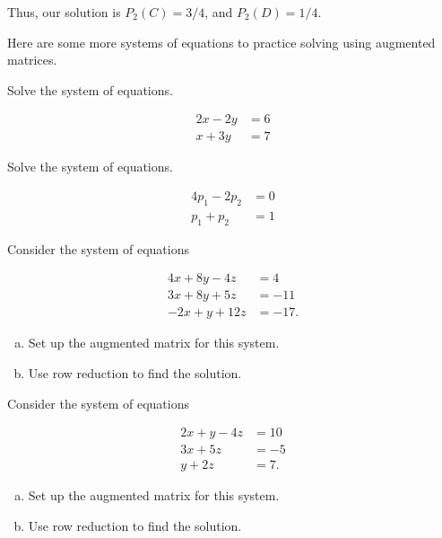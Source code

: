 Thus, our solution is $P_2(C)=3/4$, and $P_2(D)=1/4$.

Here are some more systems of equations to practice solving using augmented matrices.

\begin{xca}
Solve the system of equations.

\[\begin{matrix}
2x-2y&=6\\x+3y&=7
\end{matrix}\]

\end{xca}


\begin{xca}
Solve the system of equations.

\[\begin{matrix}
4p_1-2p_2&=0\\p_1+p_2&=1
\end{matrix}\]
\end{xca}

\begin{xca} 
Consider the system of equations 

\[\begin{matrix}
4x+8y-4z&=4\\3x+8y+5z&=-11\\-2x+y+12z&=-17.
\end{matrix}\]
\begin{enumerate}[(a)]
\item Set up the augmented matrix for this system.
\item Use row reduction to find the solution.

\end{enumerate}
\end{xca}

\begin{xca}
Consider the system of equations 

\[\begin{matrix}
2x+y-4z&=10\\3x+5z&=-5\\y+2z&=7.
\end{matrix}\]
\begin{enumerate}[(a)]
\item Set up the augmented matrix for this system.
\item Use row reduction to find the solution.
 
\end{enumerate}
\end{xca}


